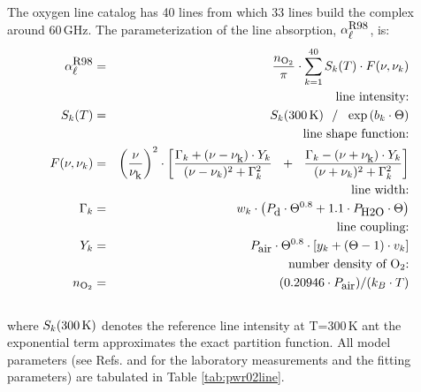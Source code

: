 The oxygen line catalog has 40 lines from which 33 lines build the 
complex around 60\,GHz. The parameterization of the line absorption,
$\alpha^{\mbox{\rm \small R98}}_{\mbox{\small $\ell$}}$, is:
\begin{eqnarray}
  \alphapwrl & = & \frac{n_{\rm O_2}}{\pi} \cdot 
                   \sum_{k=1}^{40}{S_k(T) \cdot F(\nu,\nu_k)}\\
%
%
 & & \mbox{line intensity:} \nonumber\\
      \label{eq:PWR93:O2_abs_inten}
      S_k(T) & = & S_k(300\,{\rm K})~~/~~\exp{(b_k \cdot \Theta)}\\
 & & \mbox{line shape function:} \nonumber\\
   F(\nu,\nu_k) & = & \left(\frac{\nu}{\nuk}\right)^2 \cdot 
                   \left[\frac{\Gamma_k+(\nu-\nuk)\cdot Y_k}
                              {(\nu-\nu_k)^2+\Gamma_k^2}~~+~~
                         \frac{\Gamma_k-(\nu+\nuk)\cdot Y_k}
                              {(\nu+\nu_k)^2+\Gamma_k^2}\right] \nonumber\\
 & & \mbox{line width:} \nonumber\\
    \label{eq:PWR93:O2_gamma}
    \Gamma_k & = & w_k \cdot \left(          \pda  \cdot \Theta^{0.8} + 
                                   1.1 \cdot \phzo \cdot \Theta \right)\\
 & & \mbox{line coupling:} \nonumber\\
         \label{eq:PWR93:O2_coupling}
         Y_k & = & \pdair \cdot \Theta^{0.8} \cdot 
                   \left[ y_k + (\Theta-1) \cdot v_k \right]\nonumber\\
 & & \mbox{number density of $\oz$:} \nonumber\\
           n_{\rm O_2} & = & (0.20946 \cdot \pdair)/(k_B \cdot T)\nonumber\\
           \nonumber
\end{eqnarray}
where $S_k(300\,{\rm K})$ denotes the reference line
intensity at T=300\,K ant the exponential term approximates the exact 
partition function. All model parameters (see Refs. \citet{pwr:93} and \citet{liebeetal:92}
for the laboratory measurements and the fitting parameters) are 
tabulated in Table \ref{tab:pwr02line}.
%
